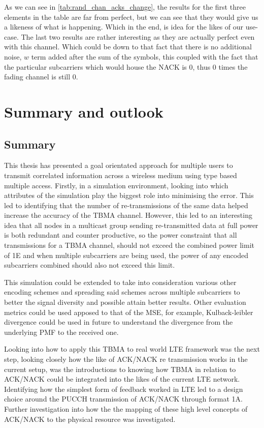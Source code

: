 \documentclass{article}
\begin{document}
As we can see in \cref{tab:rand_chan_acks_change}, the results for the first three elements in the table are far from perfect, but we can see that they would give us a likeness of what is happening. Which in the end, is idea for the likes of our use-case. The last two results are rather interesting as they are actually perfect even with this channel. Which could be down to that fact that there is no additional noise, $w$ term added after the sum of the symbols, this coupled with the fact that the particular subcarriers which would house the NACK is 0, thus 0 times the fading channel is still 0. 


\section{Summary and outlook}\label{summary_out}
\subsection{Summary}
This thesis has presented a goal orientated approach for multiple users to transmit correlated information across a wireless medium using type based multiple access. Firstly, in a simulation environment, looking into which attributes of the simulation play the biggest role into minimising the error. This led to identifying that the number of re-transmissions of the same data helped increase the accuracy of the TBMA channel. However, this led to an interesting idea that all nodes in a multicast group sending re-transmitted data at full power is both redundant and counter productive, so the power constraint that all transmissions for a TBMA channel, should not exceed the combined power limit of 1E and when multiple subcarriers are being used, the power of any encoded subcarriers combined should also not exceed this limit.

This simulation could be extended to take into consideration various other encoding schemes and spreading said schemes across multiple subcarriers to better the signal diversity and possible attain better results. Other evaluation metrics could be used apposed to that of the MSE, for example, Kulback-leibler divergence could be used in future to understand the divergence from the underlying PMF to the received one.  

Looking into how to apply this TBMA to real world LTE framework was the next step, looking closely how the like of ACK/NACK re transmission works in the current setup, was the introductions to knowing how TBMA in relation to ACK/NACK could be integrated into the likes of the current LTE network. Identifying how the simplest form of feedback worked in LTE led to a design choice around the PUCCH transmission of ACK/NACK through format 1A. Further investigation into how the the  mapping of these high level concepts of ACK/NACK to the physical resource was investigated. 
\end{document}

